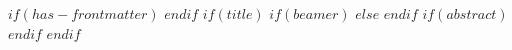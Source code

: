 $if(has-frontmatter)$
$endif$
$if(title)$
$if(beamer)$
$else$
$endif$
$if(abstract)$
$endif$
$endif$

